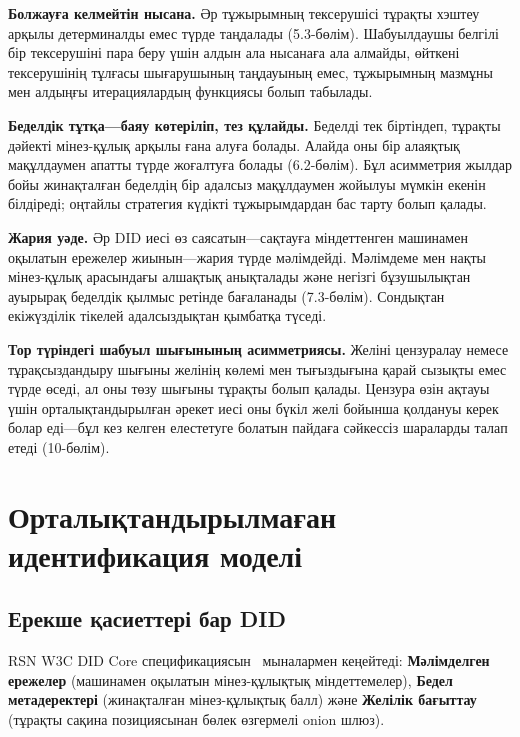 \documentclass[11pt,a4paper,twocolumn]{article}
\begin{document}
\textbf{Болжауға келмейтін нысана.} Әр тұжырымның тексерушісі тұрақты хэштеу арқылы детерминалды емес түрде таңдалады (5.3-бөлім). Шабуылдаушы белгілі бір тексерушіні пара беру үшін алдын ала нысанаға ала алмайды, өйткені тексерушінің тұлғасы шығарушының таңдауының емес, тұжырымның мазмұны мен алдыңғы итерациялардың функциясы болып табылады.

\textbf{Беделдік тұтқа---баяу көтеріліп, тез құлайды.} Беделді тек біртіндеп, тұрақты дәйекті мінез-құлық арқылы ғана алуға болады. Алайда оны бір алаяқтық мақұлдаумен апатты түрде жоғалтуға болады (6.2-бөлім). Бұл асимметрия жылдар бойы жинақталған беделдің бір адалсыз мақұлдаумен жойылуы мүмкін екенін білдіреді; оңтайлы стратегия күдікті тұжырымдардан бас тарту болып қалады.

\textbf{Жария уәде.} Әр DID иесі өз саясатын---сақтауға міндеттенген машинамен оқылатын ережелер жиынын---жария түрде мәлімдейді. Мәлімдеме мен нақты мінез-құлық арасындағы алшақтық анықталады және негізгі бұзушылықтан ауырырақ беделдік қылмыс ретінде бағаланады (7.3-бөлім). Сондықтан екіжүзділік тікелей адалсыздықтан қымбатқа түседі.

\textbf{Тор түріндегі шабуыл шығынының асимметриясы.} Желіні цензуралау немесе тұрақсыздандыру шығыны желінің көлемі мен тығыздығына қарай сызықты емес түрде өседі, ал оны төзу шығыны тұрақты болып қалады. Цензура өзін ақтауы үшін орталықтандырылған әрекет иесі оны бүкіл желі бойынша қолдануы керек болар еді---бұл кез келген елестетуге болатын пайдаға сәйкессіз шараларды талап етеді (10-бөлім).

\section{Орталықтандырылмаған идентификация моделі}

\subsection{Ерекше қасиеттері бар DID}

RSN W3C DID Core спецификациясын~\cite{did2022} мыналармен кеңейтеді: \textbf{Мәлімделген ережелер} (машинамен оқылатын мінез-құлықтық міндеттемелер), \textbf{Бедел метадеректері} (жинақталған мінез-құлықтық балл) және \textbf{Желілік бағыттау} (тұрақты сақина позициясынан бөлек өзгермелі onion шлюз).
\end{document}
